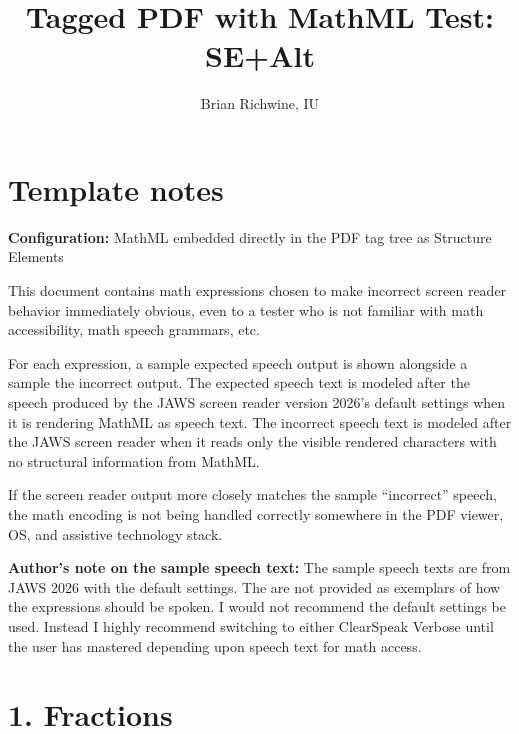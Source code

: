 \documentclass{article}
\title{Tagged PDF with MathML Test: SE+Alt}
\author{Brian Richwine, IU}
\date{}
\begin{document}
\raggedright

\maketitle

\section*{Template notes}

\textbf{Configuration:} MathML embedded directly in the PDF tag tree as Structure Elements


This document contains math expressions chosen to make incorrect screen 
reader behavior immediately obvious, even to a tester who is not familiar 
with math accessibility, math speech grammars, etc. 

For each expression, a sample expected speech output is shown alongside 
a sample the incorrect output. The expected speech text is modeled after 
the speech produced by the JAWS screen reader version 2026's default 
settings when it is rendering MathML as speech text. The incorrect speech 
text is modeled after the JAWS screen reader when it reads only the visible 
rendered characters with no structural information from MathML. 

If the screen reader output more closely matches the sample ``incorrect'' 
speech, the math encoding is not being handled correctly somewhere in 
the PDF viewer, OS, and assistive technology stack. 

\textbf{Author's note on the sample speech text:} The sample speech texts 
are from JAWS 2026 with the default settings. The are not provided as 
exemplars of how the expressions should be spoken. I would not recommend 
the default settings be used. Instead I highly recommend switching to 
either ClearSpeak Verbose until the user has mastered depending upon speech 
text for math access. 

\section*{1. Fractions}
\end{document}
